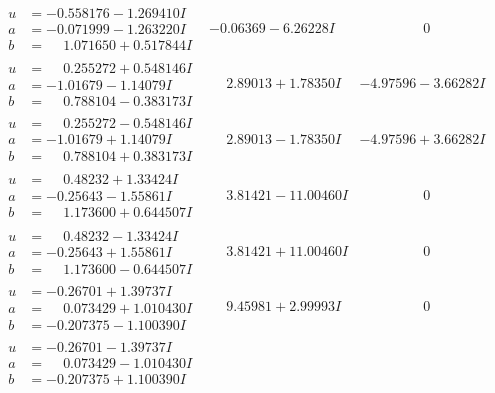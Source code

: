 \documentclass[1p]{elsarticle_modified}
\theoremstyle{definition}
\begin{document}
$$\begin{array}{c|c|c}
\begin{aligned}
u &= -0.558176 - 1.269410 I \\
a &= -0.071999 - 1.263220 I \\
b &= \phantom{-}1.071650 + 0.517844 I\end{aligned}
 & -0.06369 - 6.26228 I & \phantom{-0.000000 } 0 \\ \hline\begin{aligned}
u &= \phantom{-}0.255272 + 0.548146 I \\
a &= -1.01679 - 1.14079 I \\
b &= \phantom{-}0.788104 - 0.383173 I\end{aligned}
 & \phantom{-}2.89013 + 1.78350 I & -4.97596 - 3.66282 I \\ \hline\begin{aligned}
u &= \phantom{-}0.255272 - 0.548146 I \\
a &= -1.01679 + 1.14079 I \\
b &= \phantom{-}0.788104 + 0.383173 I\end{aligned}
 & \phantom{-}2.89013 - 1.78350 I & -4.97596 + 3.66282 I \\ \hline\begin{aligned}
u &= \phantom{-}0.48232 + 1.33424 I \\
a &= -0.25643 - 1.55861 I \\
b &= \phantom{-}1.173600 + 0.644507 I\end{aligned}
 & \phantom{-}3.81421 - 11.00460 I & \phantom{-0.000000 } 0 \\ \hline\begin{aligned}
u &= \phantom{-}0.48232 - 1.33424 I \\
a &= -0.25643 + 1.55861 I \\
b &= \phantom{-}1.173600 - 0.644507 I\end{aligned}
 & \phantom{-}3.81421 + 11.00460 I & \phantom{-0.000000 } 0 \\ \hline\begin{aligned}
u &= -0.26701 + 1.39737 I \\
a &= \phantom{-}0.073429 + 1.010430 I \\
b &= -0.207375 - 1.100390 I\end{aligned}
 & \phantom{-}9.45981 + 2.99993 I & \phantom{-0.000000 } 0 \\ \hline\begin{aligned}
u &= -0.26701 - 1.39737 I \\
a &= \phantom{-}0.073429 - 1.010430 I \\
b &= -0.207375 + 1.100390 I\end{aligned}

\end{array}$$
\end{document}
